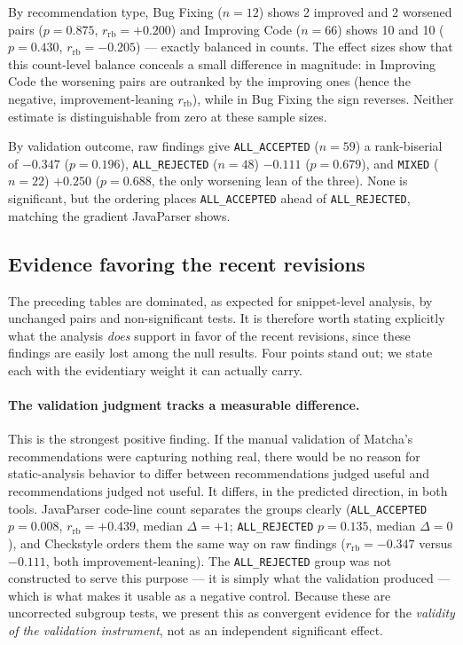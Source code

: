 By recommendation type, Bug Fixing ($n=12$) shows 2 improved and 2 worsened pairs ($p=0.875$, $r_{\text{rb}}=+0.200$) and Improving Code ($n=66$) shows 10 and 10 ($p=0.430$, $r_{\text{rb}}=-0.205$) --- exactly balanced in counts.
The effect sizes show that this count-level balance conceals a small difference in magnitude: in Improving Code the worsening pairs are outranked by the improving ones (hence the negative, improvement-leaning $r_{\text{rb}}$), while in Bug Fixing the sign reverses.
Neither estimate is distinguishable from zero at these sample sizes.

By validation outcome, raw findings give \texttt{ALL\_ACCEPTED} ($n=59$) a rank-biserial of $-0.347$ ($p=0.196$), \texttt{ALL\_REJECTED} ($n=48$) $-0.111$ ($p=0.679$), and \texttt{MIXED} ($n=22$) $+0.250$ ($p=0.688$, the only worsening lean of the three).
None is significant, but the ordering places \texttt{ALL\_ACCEPTED} ahead of \texttt{ALL\_REJECTED}, matching the gradient JavaParser shows.

\subsection{Evidence favoring the recent revisions}
\label{sec:or-positive}

The preceding tables are dominated, as expected for snippet-level analysis, by unchanged pairs and non-significant tests.
It is therefore worth stating explicitly what the analysis \emph{does} support in favor of the recent revisions, since these findings are easily lost among the null results.
Four points stand out; we state each with the evidentiary weight it can actually carry.

\paragraph{The validation judgment tracks a measurable difference.}
This is the strongest positive finding.
If the manual validation of Matcha's recommendations were capturing nothing real, there would be no reason for static-analysis behavior to differ between recommendations judged useful and recommendations judged not useful.
It differs, in the predicted direction, in both tools.
JavaParser code-line count separates the groups clearly (\texttt{ALL\_ACCEPTED} $p=0.008$, $r_{\text{rb}}=+0.439$, median $\Delta=+1$; \texttt{ALL\_REJECTED} $p=0.135$, median $\Delta=0$), and Checkstyle orders them the same way on raw findings ($r_{\text{rb}}=-0.347$ versus $-0.111$, both improvement-leaning).
The \texttt{ALL\_REJECTED} group was not constructed to serve this purpose --- it is simply what the validation produced --- which is what makes it usable as a negative control.
Because these are uncorrected subgroup tests, we present this as convergent evidence for the \emph{validity of the validation instrument}, not as an independent significant effect.

